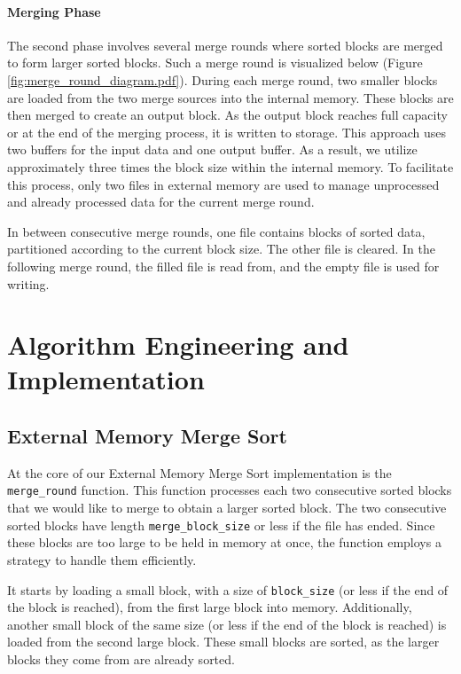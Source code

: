 \documentclass[twocolumn]{article}
\begin{document}
\paragraph*{Merging Phase}
The second phase involves several merge rounds where sorted blocks are merged to form larger sorted blocks. Such a merge round is visualized below (Figure \ref{fig:merge_round_diagram.pdf}).
During each merge round, two smaller blocks are loaded from the two merge sources into the internal memory.
These blocks are then merged to create an output block. As the output block reaches full capacity or at the end of the merging process, it is written to storage.
This approach uses two buffers for the input data and one output buffer. As a result, we utilize approximately three times the block size within the internal memory.
To facilitate this process, only two files in external memory are used to manage unprocessed and already processed data for the current merge round.

In between consecutive merge rounds, one file contains blocks of sorted data, partitioned according to the current block size.
The other file is cleared. In the following merge round, the filled file is read from, and the empty file is used for writing.

\section{Algorithm Engineering and Implementation}

\subsection{External Memory Merge Sort}
At the core of our External Memory Merge Sort implementation is the \texttt{merge\_round} function. This function processes each two consecutive sorted blocks that we
would like to merge to obtain a larger sorted block.
The two consecutive sorted blocks have length \texttt{merge\_block\_size} or less if the file has ended.
Since these blocks are too large to be held in memory at once, the function employs a strategy to handle them efficiently.

It starts by loading a small block, with a size of \texttt{block\_size} (or less if the end of the block is reached), from the first large block into memory.
Additionally, another small block of the same size (or less if the end of the block is reached) is loaded from the second large block.
These small blocks are sorted, as the larger blocks they come from are already sorted.
\end{document}
